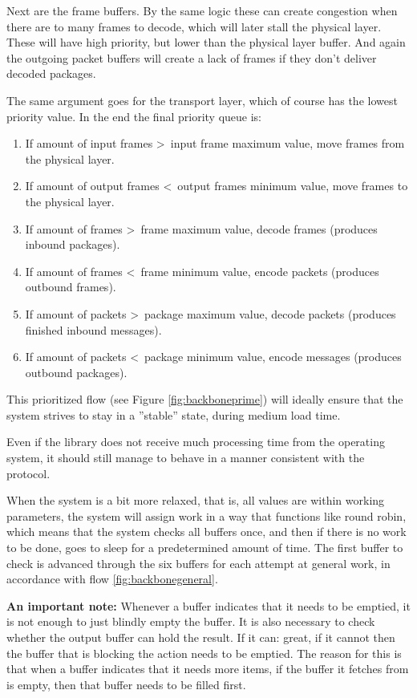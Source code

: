 Next are the frame buffers. By the same logic these can create congestion when there are to many frames to decode, which will later stall the physical layer. These will have high priority, but lower than the physical layer buffer.
And again the outgoing packet buffers will create a lack of frames if they don't deliver decoded packages.

The same argument goes for the transport layer, which of course has the lowest priority value.
 In the end the final priority queue is:

\begin{enumerate}
\item If amount of input frames \textgreater\, input frame maximum value, move frames from the physical layer.
\item If amount of output frames \textless\, output frames minimum value, move frames to the physical layer.
\item If amount of frames \textgreater\, frame maximum value, decode frames (produces inbound packages).
\item If amount of frames \textless\, frame minimum value, encode packets (produces outbound frames).
\item If amount of packets \textgreater\, package maximum value, decode packets (produces finished inbound messages).
\item If amount of packets \textless\, package minimum value, encode messages (produces outbound packages).
\end{enumerate}


This prioritized flow (see Figure \ref{fig:backboneprime}) will ideally ensure that the system strives to stay in a ''stable'' state, during medium load time. 


Even if the library does not receive much processing time from the operating system, it should still manage to behave in a manner consistent with the protocol.


When the system is a bit more relaxed, that is, all values are within working parameters, the system will assign work in a way that functions like round robin, which means that the system checks all buffers once, and then if there is no work to be done, goes to sleep for a predetermined amount of time. The first buffer to check is advanced through the six buffers for each attempt at general work, in accordance with flow \ref{fig:backbonegeneral}.




\textbf{An important note:}
Whenever a buffer indicates that it needs to be emptied, it is not enough to just blindly empty the buffer. It is also necessary to check whether the output buffer can hold the result. If it can: great, if it cannot then the buffer that is blocking the action needs to be emptied.
The reason for this is that when a buffer indicates that it needs more items, if the buffer it fetches from is empty, then that buffer needs to be filled first.


